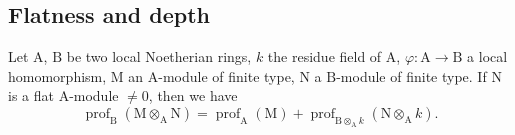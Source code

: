 \subsection{Flatness and depth}
\label{subsection:IV.6.3}

\begin{proposition}[6.3.1]
\label{IV.6.3.1}
Let $\mathrm{A}$, $\mathrm{B}$ be two local Noetherian rings, $k$ the residue field of $\mathrm{A}$, $\varphi:\mathrm{A}\to\mathrm{B}$ a local homomorphism, $\mathrm{M}$ an $\mathrm{A}$-module of finite type, $\mathrm{N}$ a $\mathrm{B}$-module of finite type.
If $\mathrm{N}$ is a flat $\mathrm{A}$-module $\neq 0$, then we have
\begin{equation}
  \operatorname{prof}_\mathrm{B}(\mathrm{M}\otimes_\mathrm{A}\mathrm{N})=\operatorname{prof}_\mathrm{A}(\mathrm{M})+\operatorname{prof}_{\mathrm{B}\otimes_\mathrm{A} k}(\mathrm{N}\otimes_\mathrm{A} k).
  \tag{6.3.1.1}
\label{IV.6.3.1.1}
\end{equation}
\end{proposition}

